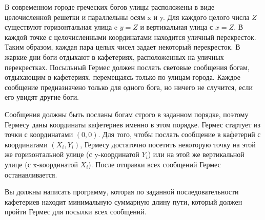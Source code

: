 В современном городе греческих богов улицы расположены в виде целочисленной решетки
и параллельны осям x и y. Для каждого целого числа $Z$ существуют горизонтальная улица
c $y=Z$ и вертикальная улица с $x=Z$. В каждой точке с целочисленными координатами
находится уличный перекресток. Таким образом, каждая пара целых чисел задает
некоторый перекресток. В жаркие дни боги отдыхают в кафетериях, расположенных
на уличных перекрестках. Посыльный Гермес должен послать световые сообщения богам,
отдыхающим в кафетериях, перемещаясь только по улицам города. Каждое сообщение
предназначено только для одного бога, но ничего не случится, если его увидят другие боги.

Сообщения должны быть посланы богам строго в заданном порядке, поэтому Гермесу даны
координаты кафетериев именно в этом порядке. Гермес стартует из точки с координатами $(0, 0)$.
Для того, чтобы послать сообщение в кафетерий с координатами $(X_i, Y_i)$,
Гермесу достаточно посетить некоторую точку на этой же горизонтальной улице 
(с y-координатой $Y_i$) или на этой же вертикальной улице (с x-координатой $X_i$).
После отправки всех сообщений Гермес останавливается.

Вы должны написать программу, которая по заданной последовательности кафетериев находит 
минимальную суммарную длину пути, который должен пройти Гермес для посылки всех сообщений.
